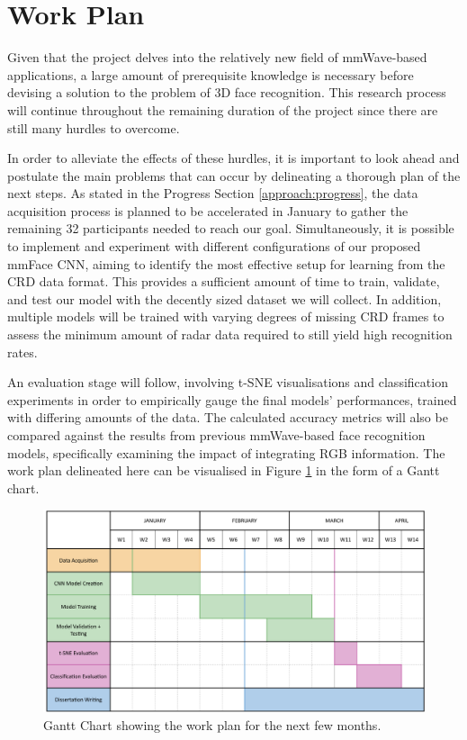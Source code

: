 \documentclass{interim}
\begin{document}
\section{Work Plan}
Given that the project delves into the relatively new field of mmWave-based applications, a large amount of prerequisite knowledge is necessary before devising a solution to the problem of 3D face recognition. This research process will continue throughout the remaining duration of the project since there are still many hurdles to overcome. 

In order to alleviate the effects of these hurdles, it is important to look ahead and postulate the main problems that can occur by delineating a thorough plan of the next steps. As stated in the Progress Section \ref{approach:progress}, the data acquisition process is planned to be accelerated in January to gather the remaining 32 participants needed to reach our goal. Simultaneously, it is possible to implement and experiment with different configurations of our proposed mmFace CNN, aiming to identify the most effective setup for learning from the CRD data format. This provides a sufficient amount of time to train, validate, and test our model with the decently sized dataset we will collect. In addition, multiple models will be trained with varying degrees of missing CRD frames to assess the minimum amount of radar data required to still yield high recognition rates.

An evaluation stage will follow, involving t-SNE visualisations and classification experiments in order to empirically gauge the final models' performances, trained with differing amounts of the data. The calculated accuracy metrics will also be compared against the results from previous mmWave-based face recognition models, specifically examining the impact of integrating RGB information. The work plan delineated here can be visualised in Figure \ref{fig:gantt_chart} in the form of a Gantt chart.

\begin{figure}[h!]
    \centering
    \includegraphics[width=1\textwidth]{images/gantt_chart.pdf}
    \caption{Gantt Chart showing the work plan for the next few months.}
    \label{fig:gantt_chart}
\end{figure}




\end{document}
